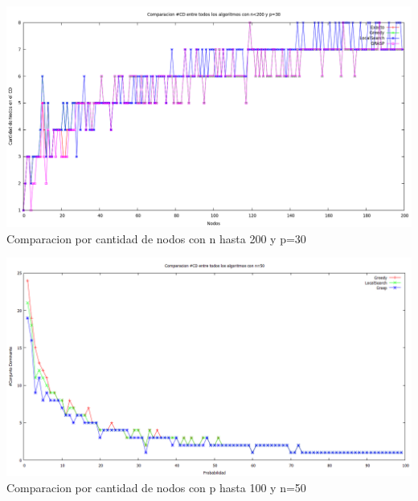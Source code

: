 
\begin{center}
\includegraphics[width=17cm]{./graficos/comparacioncantCDnvariablep30.png}\\
Comparacion por cantidad de nodos con n hasta 200 y p=30
\end{center}




\begin{center}
\includegraphics[width=17cm]{./graficos/comparacioncantCDprobvariablen50.png}\\
Comparacion por cantidad de nodos con p hasta 100 y n=50
\end{center}


